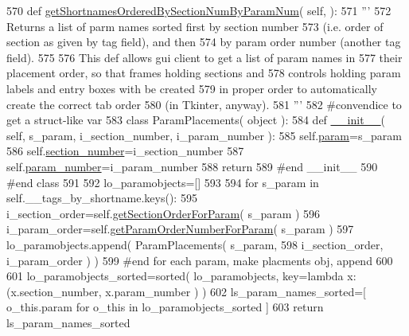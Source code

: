 \begin{DoxyCode}
570     \textcolor{keyword}{def }\hyperlink{classnegui_1_1pgparamset_1_1PGParamSet_a4f1aab0d1de87fbf66ea057e3577804c}{getShortnamesOrderedBySectionNumByParamNum}( self, ):
571         \textcolor{stringliteral}{'''}
572 \textcolor{stringliteral}{        Returns a list of parm names sorted first by section number}
573 \textcolor{stringliteral}{        (i.e. order of section as given by tag field), and then }
574 \textcolor{stringliteral}{        by param order number (another tag field). }
575 \textcolor{stringliteral}{}
576 \textcolor{stringliteral}{        This def allows gui client to get a list of param names in }
577 \textcolor{stringliteral}{        their placement order, so that frames holding sections and}
578 \textcolor{stringliteral}{        controls holding param labels and entry boxes with be created}
579 \textcolor{stringliteral}{        in proper order to automatically create the correct tab order}
580 \textcolor{stringliteral}{        (in Tkinter, anyway).}
581 \textcolor{stringliteral}{        '''}
582         \textcolor{comment}{#convendice to get a struct-like var}
583         \textcolor{keyword}{class }ParamPlacements( object ):
584             \textcolor{keyword}{def }\hyperlink{classnegui_1_1pgparamset_1_1PGParamSet_a598ea6a166f56fe5be01f86d4d8c91ba}{\_\_init\_\_}( self, s\_param, i\_section\_number, i\_param\_number ):
585                 self.\hyperlink{classnegui_1_1pgparamset_1_1PGParamSet_a51a7d3fde3da41e93f0c9f538ccd0edf}{param}=s\_param
586                 self.\hyperlink{classnegui_1_1pgparamset_1_1PGParamSet_a04420e446c9dd25d5d88fd62a734cb6e}{section\_number}=i\_section\_number
587                 self.\hyperlink{classnegui_1_1pgparamset_1_1PGParamSet_ab9fca9825029bbe54878b4b6f32c75c7}{param\_number}=i\_param\_number
588                 \textcolor{keywordflow}{return}
589             \textcolor{comment}{#end \_\_init\_\_}
590         \textcolor{comment}{#end class}
591 
592         lo\_paramobjects=[]
593 
594         \textcolor{keywordflow}{for} s\_param \textcolor{keywordflow}{in} self.\_\_tags\_by\_shortname.keys():
595             i\_section\_order=self.\hyperlink{classnegui_1_1pgparamset_1_1PGParamSet_a18000b825994a6784da5ead88e300e98}{getSectionOrderForParam}( s\_param )
596             i\_param\_order=self.\hyperlink{classnegui_1_1pgparamset_1_1PGParamSet_a5eccd6863398ff156943e9f3dd3c2b4c}{getParamOrderNumberForParam}( s\_param )
597             lo\_paramobjects.append( ParamPlacements( s\_param, 
598                                     i\_section\_order, i\_param\_order ) )
599         \textcolor{comment}{#end for each param, make placments obj, append}
600 
601         lo\_paramobjects\_sorted=sorted( lo\_paramobjects, key=\textcolor{keyword}{lambda} x: (x.section\_number, x.param\_number ) )
602         ls\_param\_names\_sorted=[ o\_this.param \textcolor{keywordflow}{for} o\_this \textcolor{keywordflow}{in} lo\_paramobjects\_sorted ]
603         \textcolor{keywordflow}{return} ls\_param\_names\_sorted
\end{DoxyCode}
